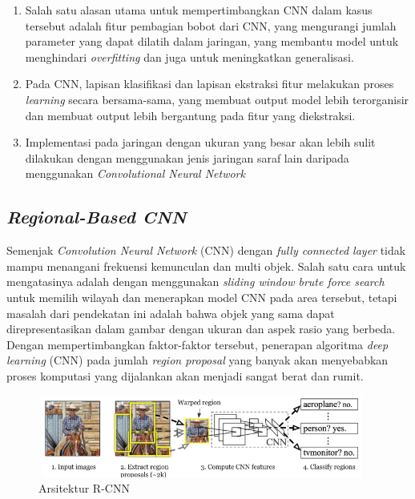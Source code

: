 \begin{enumerate}
	\item Salah satu alasan utama untuk mempertimbangkan CNN dalam kasus tersebut adalah fitur pembagian bobot dari CNN, yang mengurangi jumlah parameter yang dapat dilatih dalam jaringan, yang membantu model untuk menghindari \textit{overfitting} dan juga untuk meningkatkan generalisasi.
	\item Pada CNN, lapisan klasifikasi dan lapisan ekstraksi fitur melakukan proses \textit{learning} secara bersama-sama, yang membuat output model lebih terorganisir dan membuat output lebih bergantung pada fitur yang diekstraksi.
	\item Implementasi pada jaringan dengan ukuran yang besar akan lebih sulit dilakukan dengan menggunakan jenis jaringan saraf lain daripada menggunakan \textit{Convolutional Neural Network}
\end{enumerate}

\subsection{\textit{Regional-Based CNN}}
\label{subsec:rcnn}

Semenjak\textit{ Convolution Neural Network} (CNN) dengan \textit{fully connected layer} tidak mampu menangani frekuensi kemunculan dan multi objek. Salah satu cara untuk mengatasinya adalah dengan menggunakan \textit{sliding window brute force search} untuk memilih wilayah dan menerapkan model CNN pada area tersebut, tetapi masalah dari pendekatan ini adalah bahwa objek yang sama dapat direpresentasikan dalam gambar dengan ukuran dan aspek rasio yang berbeda. Dengan mempertimbangkan faktor-faktor tersebut, penerapan algoritma \textit{deep learning} (CNN) pada jumlah \textit{region proposal} yang banyak akan menyebabkan proses komputasi yang dijalankan akan menjadi sangat berat dan rumit.

\begin{figure}[h!]
	\centering
	\includegraphics[scale=0.3]{gambar/rcnn.png}
	\caption{Arsitektur R-CNN \citep{arch-rcnn}}
	\label{fig:rcnn}
\end{figure}

